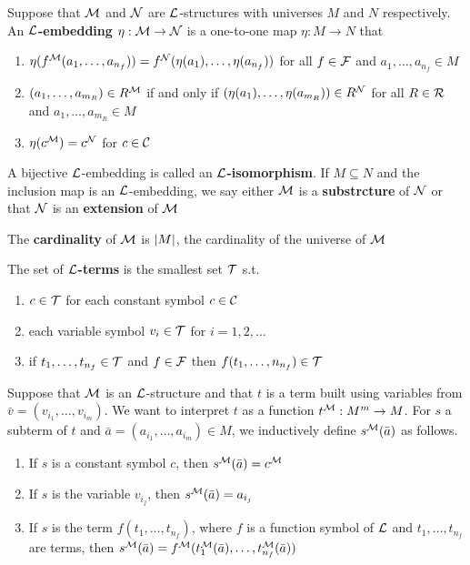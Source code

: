 \documentclass[11pt]{article}
\begin{document}
\begin{definition}[]
Suppose that \(\mathcal{M}\) and \(\mathcal{N}\) are \(\mathcal{L}\)-structures with universes \(M\)
and \(N\) respectively. An \textbf{\(\mathcal{L}\)-embedding} \(\eta:\mathcal{M}\to\mathcal{N}\) is a
one-to-one map \(\eta:M\to N\) that
\begin{enumerate}
\item \(\eta(f^{\mathcal{M}}(a_1,\dots,a_{n_f}))=f^{\mathcal{N}}(\eta(a_1),\dots,\eta(a_{n_f}))\)
for all \(f\in\mathcal{F}\) and \(a_1,\dots,a_{n_f}\in M\)
\item \((a_1,\dots,a_{m_R})\in R^{\mathcal{M}}\) if and only if
\((\eta(a_1),\dots,\eta(a_{m_R}))\in R^{\mathcal{N}}\) for all \(R\in\mathcal{R}\) and
\(a_1,\dots,a_{m_R}\in M\)
\item \(\eta(c^{\mathcal{M}})=c^{\mathcal{N}}\) for \(c\in\mathcal{C}\)
\end{enumerate}
\end{definition}


A bijective \(\mathcal{L}\)-embedding is called an \textbf{\(\mathcal{L}\)-isomorphism}. If
\(M\subseteq N\) and the inclusion map is an \(\mathcal{L}\)-embedding, we say either
\(\mathcal{M}\) is a \textbf{substrcture} of \(\mathcal{N}\) or that \(\mathcal{N}\) is an \textbf{extension}
of \(\mathcal{M}\)

The \textbf{cardinality} of \(\mathcal{M}\) is \(\abs{M}\), the cardinality of the universe of \(\mathcal{M}\)

\begin{definition}[]
The set of \textbf{\(\mathcal{L}\)-terms} is the smallest set \(\mathcal{T}\) s.t.
\begin{enumerate}
\item \(c\in\mathcal{T}\) for each constant symbol \(c\in\mathcal{C}\)
\item each variable symbol \(v_i\in\mathcal{T}\) for \(i=1,2,\dots\)
\item if \(t_1,\dots,t_{n_f}\in\mathcal{T}\) and \(f\in\mathcal{F}\) then
\(f(t_1,\dots,n_{n_f})\in\mathcal{T}\)
\end{enumerate}
\end{definition}


Suppose that \(\mathcal{M}\) is an \(\mathcal{L}\)-structure and that \(t\) is a term built
using variables from \(\bar{v}=(v_{i_1},\dots,v_{i_m})\). We want to interpret
\(t\) as a function \(t^{\mathcal{M}}:M^m\to M\). For \(s\) a subterm of \(t\) and
\(\bar{a}=(a_{i_1},\dots,a_{i_m})\in M\), we inductively define
\(s^{\mathcal{M}}(\bar{a})\) as follows.
\begin{enumerate}
\item If \(s\) is a constant symbol \(c\), then \(s^{\mathcal{M}}(\bar{a})=c^{\mathcal{M}}\)
\item If \(s\) is the variable \(v_{i_j}\), then \(s^{\mathcal{M}}(\bar{a})=a_{i_j}\)
\item If \(s\) is the term \(f(t_1,\dots,t_{n_f})\), where \(f\) is a function symbol
of \(\mathcal{L}\) and \(t_1,\dots,t_{n_f}\) are terms, then 
\(s^{\mathcal{M}}(\bar{a})=f^{\mathcal{M}}(t^{\mathcal{M}}_1(\bar{a}),\dots,t_{n_f}^{\mathcal{M}}(\bar{a}))\)
\end{enumerate}
\end{document}

